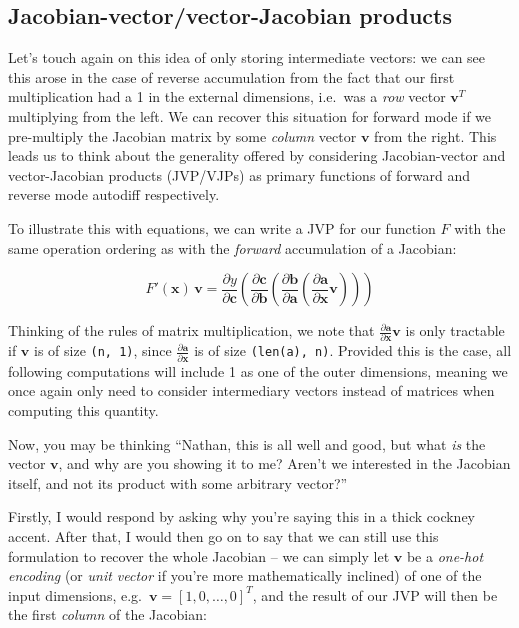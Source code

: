 \documentclass[
  11pt,
  numbers=noendperiod]{book}
\begin{document}
\hypertarget{jacobian-vectorvector-jacobian-products}{%
\subsection{Jacobian-vector/vector-Jacobian
products}\label{jacobian-vectorvector-jacobian-products}}

Let's touch again on this idea of only storing intermediate vectors: we
can see this arose in the case of reverse accumulation from the fact
that our first multiplication had a 1 in the external dimensions,
i.e.~was a \emph{row} vector \(\mathbf{v}^T\) multiplying from the left.
We can recover this situation for forward mode if we pre-multiply the
Jacobian matrix by some \emph{column} vector \(\mathbf{v}\) from the
right. This leads us to think about the generality offered by
considering Jacobian-vector and vector-Jacobian products (JVP/VJPs) as
primary functions of forward and reverse mode autodiff respectively.

To illustrate this with equations, we can write a JVP for our function
\(F\) with the same operation ordering as with the \emph{forward}
accumulation of a Jacobian:

\[
F'(\mathbf{x})\,\mathbf{v} = \frac{\partial y}{\partial \mathbf{c}}\left(\frac{\partial \mathbf{c}}{\partial \mathbf{b}}\left(\frac{\partial \mathbf{b}}{\partial \mathbf{a}} \left(\frac{\partial \mathbf{a}}{\partial \mathbf{x}} \mathbf{v} \right) \right)\right)
\]

Thinking of the rules of matrix multiplication, we note that
\(\frac{\partial \mathbf{a}}{\partial \mathbf{x}} \mathbf{v}\) is only
tractable if \(\mathbf{v}\) is of size \texttt{(n,\ 1)}, since
\(\frac{\partial \mathbf{a}}{\partial \mathbf{x}}\) is of size
\texttt{(len(a),\ n)}. Provided this is the case, all following
computations will include 1 as one of the outer dimensions, meaning we
once again only need to consider intermediary vectors instead of
matrices when computing this quantity.

Now, you may be thinking ``Nathan, this is all well and good, but what
\emph{is} the vector \(\mathbf{v}\), and why are you showing it to me?
Aren't we interested in the Jacobian itself, and not its product with
some arbitrary vector?''

Firstly, I would respond by asking why you're saying this in a thick
cockney accent. After that, I would then go on to say that we can still
use this formulation to recover the whole Jacobian -- we can simply let
\(\mathbf{v}\) be a \emph{one-hot encoding} (or \emph{unit vector} if
you're more mathematically inclined) of one of the input dimensions,
e.g.~\(\mathbf{v} = [1, 0, \dots, 0]^T\), and the result of our JVP will
then be the first \emph{column} of the Jacobian:
\end{document}
